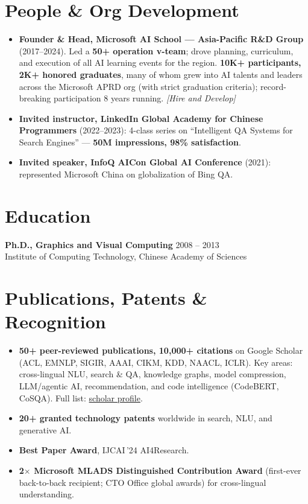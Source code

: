 \documentclass[10.5pt,letterpaper]{article}
\newcommand{\lp}[1]{\textcolor{blue!55!black}{\small\textit{[#1]}}}
\begin{document}
\section*{People \& Org Development}
\begin{itemize}
  \item \textbf{Founder \& Head, Microsoft AI School --- Asia-Pacific R\&D Group} (2017--2024). Led a \textbf{50+ operation v-team}; drove planning, curriculum, and execution of all AI learning events for the region. \textbf{10K+ participants, 2K+ honored graduates}, many of whom grew into AI talents and leaders across the Microsoft APRD org (with strict graduation criteria); record-breaking participation 8 years running. \lp{Hire and Develop}
  \item \textbf{Invited instructor, LinkedIn Global Academy for Chinese Programmers} (2022--2023): 4-class series on ``Intelligent QA Systems for Search Engines'' — \textbf{50M impressions, 98\% satisfaction}.
  \item \textbf{Invited speaker, InfoQ AICon Global AI Conference} (2021): represented Microsoft China on globalization of Bing QA.
\end{itemize}

\section*{Education}
\noindent\textbf{Ph.D., Graphics and Visual Computing} \hfill 2008 -- 2013\\
Institute of Computing Technology, Chinese Academy of Sciences

\section*{Publications, Patents \& Recognition}
\begin{itemize}
  \item \textbf{50+ peer-reviewed publications, 10{,}000+ citations} on Google Scholar (ACL, EMNLP, SIGIR, AAAI, CIKM, KDD, NAACL, ICLR). Key areas: cross-lingual NLU, search \& QA, knowledge graphs, model compression, LLM/agentic AI, recommendation, and code intelligence (CodeBERT, CoSQA). Full list: \href{https://scholar.google.com/citations?user=c7JEFwsAAAAJ}{scholar profile}.
  \item \textbf{20+ granted technology patents} worldwide in search, NLU, and generative AI.
  \item \textbf{Best Paper Award}, IJCAI\,'24 AI4Research.
  \item \textbf{2$\times$ Microsoft MLADS Distinguished Contribution Award} (first-ever back-to-back recipient; CTO Office global awards) for cross-lingual understanding.
\end{itemize}
\end{document}
